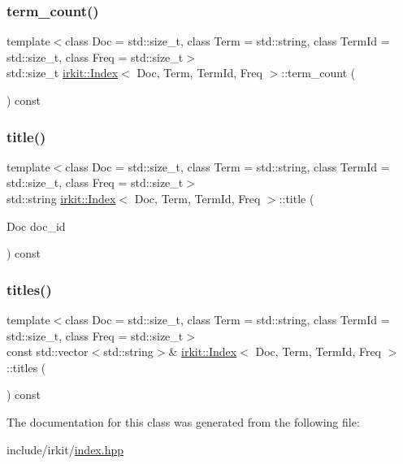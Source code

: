 \mbox{\label{classirkit_1_1Index_a3051984667589401814296f54e72e32c}} 
\subsubsection{\texorpdfstring{term\+\_\+count()}{term\_count()}}
{\footnotesize\ttfamily template$<$class Doc  = std\+::size\+\_\+t, class Term  = std\+::string, class Term\+Id  = std\+::size\+\_\+t, class Freq  = std\+::size\+\_\+t$>$ \\
std\+::size\+\_\+t \hyperlink{classirkit_1_1Index}{irkit\+::\+Index}$<$ Doc, Term, Term\+Id, Freq $>$\+::term\+\_\+count (\begin{DoxyParamCaption}{ }\end{DoxyParamCaption}) const\hspace{0.3cm}{\ttfamily [inline]}}

\mbox{\label{classirkit_1_1Index_a6a4d5f7860e2359b89270d20302e6f0b}} 
\subsubsection{\texorpdfstring{title()}{title()}}
{\footnotesize\ttfamily template$<$class Doc  = std\+::size\+\_\+t, class Term  = std\+::string, class Term\+Id  = std\+::size\+\_\+t, class Freq  = std\+::size\+\_\+t$>$ \\
std\+::string \hyperlink{classirkit_1_1Index}{irkit\+::\+Index}$<$ Doc, Term, Term\+Id, Freq $>$\+::title (\begin{DoxyParamCaption}\item[{Doc}]{doc\+\_\+id }\end{DoxyParamCaption}) const\hspace{0.3cm}{\ttfamily [inline]}}

\mbox{\label{classirkit_1_1Index_a632caff9525484c5d453d016c5cb586e}} 
\subsubsection{\texorpdfstring{titles()}{titles()}}
{\footnotesize\ttfamily template$<$class Doc  = std\+::size\+\_\+t, class Term  = std\+::string, class Term\+Id  = std\+::size\+\_\+t, class Freq  = std\+::size\+\_\+t$>$ \\
const std\+::vector$<$std\+::string$>$\& \hyperlink{classirkit_1_1Index}{irkit\+::\+Index}$<$ Doc, Term, Term\+Id, Freq $>$\+::titles (\begin{DoxyParamCaption}{ }\end{DoxyParamCaption}) const\hspace{0.3cm}{\ttfamily [inline]}}



The documentation for this class was generated from the following file\+:\begin{DoxyCompactItemize}
\item 
include/irkit/\hyperlink{irkit_2index_8hpp}{index.\+hpp}\end{DoxyCompactItemize}
